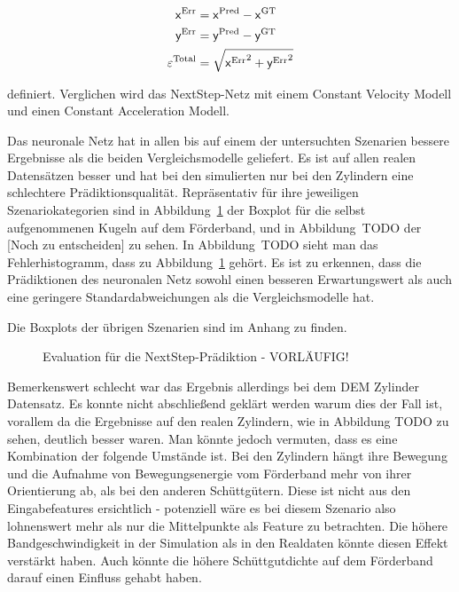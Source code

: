 \begin{align*}
    \mathsf{x}{^{\text{Err}}} &=  \mathsf{x}{^{\text{Pred}}} -  \mathsf{x}{^{\text{GT}}} \\
    \mathsf{y}{^{\text{Err}}} &=  \mathsf{y}{^{\text{Pred}}} -  \mathsf{y}{^{\text{GT}}} \\
    \varepsilon{^{\text{Total}}} &= \sqrt{ \mathsf{x}{^{\text{Err}}}^2 +  \mathsf{y}{^{\text{Err}}}^2}
\end{align*}

definiert. Verglichen wird das NextStep-Netz mit einem Constant Velocity Modell und einen Constant Acceleration Modell.

Das neuronale Netz hat in allen bis auf einem der untersuchten Szenarien bessere Ergebnisse als die beiden Vergleichsmodelle geliefert.
Es ist auf allen realen Datensätzen besser und hat bei den simulierten nur bei den Zylindern eine schlechtere Prädiktionsqualität.
Repräsentativ für ihre jeweiligen Szenariokategorien sind in Abbildung~\ref{fig:boxplotErrorNNnextStep} der Boxplot für die selbst aufgenommenen Kugeln auf dem Förderband,
und in Abbildung~TODO der [Noch zu entscheiden] zu sehen.
In Abbildung~TODO sieht man das Fehlerhistogramm, dass zu Abbildung~\ref{fig:boxplotErrorNNnextStep} gehört.
Es ist zu erkennen, dass die Prädiktionen des neuronalen Netz sowohl einen besseren Erwartungswert als auch eine geringere Standardabweichungen als die Vergleichsmodelle hat.


Die Boxplots der übrigen Szenarien sind im Anhang zu finden.



\begin{figure}[h]
    \centering
	\caption{Evaluation für die NextStep-Prädiktion - VORLÄUFIG!}
	\label{fig:boxplotErrorNNnextStep}
\end{figure}



Bemerkenswert schlecht war das Ergebnis allerdings bei dem DEM Zylinder Datensatz.
Es konnte nicht abschließend geklärt werden warum dies der Fall ist, vorallem da die Ergebnisse auf den realen Zylindern, wie in Abbildung TODO zu sehen, deutlich besser waren. 
Man könnte jedoch vermuten, dass es eine Kombination der folgende Umstände ist.
Bei den Zylindern hängt ihre Bewegung und die Aufnahme von Bewegungsenergie vom Förderband mehr von ihrer Orientierung ab, als bei den anderen Schüttgütern.
Diese ist nicht aus den Eingabefeatures ersichtlich - potenziell wäre es bei diesem Szenario also lohnenswert mehr als nur die Mittelpunkte als Feature zu betrachten.
Die höhere Bandgeschwindigkeit in der Simulation als in den Realdaten könnte diesen Effekt verstärkt haben.
Auch könnte die höhere Schüttgutdichte auf dem Förderband darauf einen Einfluss gehabt haben.



